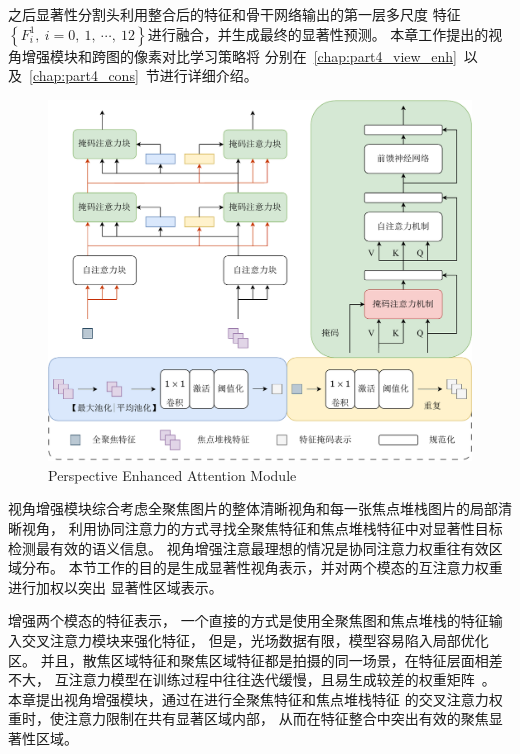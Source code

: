 之后显著性分割头利用整合后的特征和骨干网络输出的第一层多尺度
特征$\left \{ F_{i}^{1},~i=0,~1,~ \cdots, ~12 \right \}$进行融合，并生成最终的显著性预测。
%
%
%
%
%
%
本章工作提出的视角增强模块和跨图的像素对比学习策略将
分别在~\ref{chap:part4_view_enh}~以及~\ref{chap:part4_cons}~节进行详细介绍。
%
%
%
%
%
%
%
%
\label{chap:part4_view_enh}
% 
% 
% 
%
%
\begin{figure}[!ht]
	\centering
	\includegraphics[width=0.95\linewidth]{figures/chapter4/view_enhance}
	{Perspective Enhanced Attention Module}  
	\label{cpt4_fig1:view_enhance}
\end{figure}
%
%
%
%
\par 
%
%
%
%
视角增强模块综合考虑全聚焦图片的整体清晰视角和每一张焦点堆栈图片的局部清晰视角，
利用协同注意力的方式寻找全聚焦特征和焦点堆栈特征中对显著性目标检测最有效的语义信息。
视角增强注意最理想的情况是协同注意力权重往有效区域分布。
本节工作的目的是生成显著性视角表示，并对两个模态的互注意力权重进行加权以突出
显著性区域表示。


增强两个模态的特征表示，
一个直接的方式是使用全聚焦图和焦点堆栈的特征输入交叉注意力模块来强化特征，
但是，光场数据有限，模型容易陷入局部优化区。
并且，散焦区域特征和聚焦区域特征都是拍摄的同一场景，在特征层面相差不大，
互注意力模型在训练过程中往往迭代缓慢，且易生成较差的权重矩阵~\cite{piao2021panet}。
本章提出视角增强模块，通过在进行全聚焦特征和焦点堆栈特征
的交叉注意力权重时，使注意力限制在共有显著区域内部，
从而在特征整合中突出有效的聚焦显著性区域。


